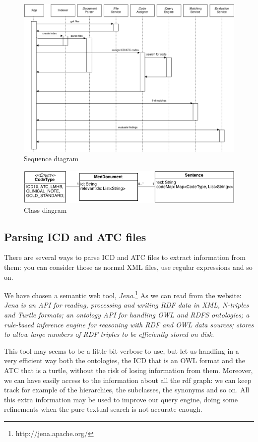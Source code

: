 \documentclass{article}
\begin{document}
\begin{figure}[h!]
    \label{fig:seq}
    \centering
    \includegraphics[width=1.0\textwidth]{seq}
    \caption{Sequence diagram}
\end{figure}

\begin{figure}[h!]
  \centering
    \includegraphics[width=1.0\textwidth]{class}
    \caption{Class diagram}
\end{figure}

\subsection{Parsing ICD and ATC files}

There are several ways to parse ICD and ATC files to extract information from them: you can consider those as normal XML files, use regular expressions and so on.

We have chosen a semantic web tool, \emph{Jena}.\footnote{http://jena.apache.org/} As we can read from the website: \emph{Jena is an API for reading, processing and writing RDF data in XML, N-triples and Turtle formats; an ontology API for handling OWL and RDFS ontologies; a rule-based inference engine for reasoning with RDF and OWL data sources; stores to allow large numbers of RDF triples to be efficiently stored on disk}. 

This tool may seems to be a little bit verbose to use, but let us handling in a very efficient way both the ontologies, the ICD that is an OWL format and the ATC that is a turtle, without the risk of losing information from them. Moreover, we can have easily access to the information about all the rdf graph: we can keep track for example of the hierarchies, the subclasses, the synonyms and so on. All this extra information may be used to improve our query engine, doing some refinements when the pure textual search is not accurate enough.
\end{document}

